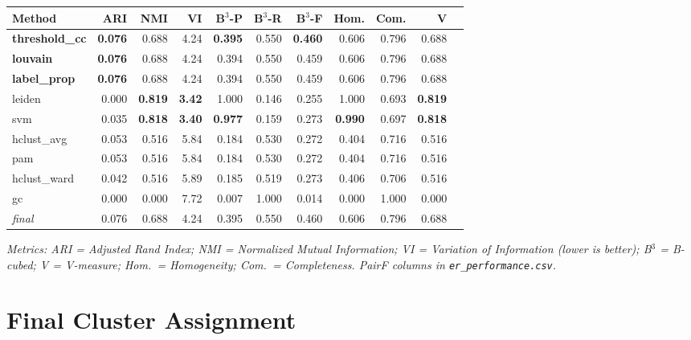\documentclass[11pt, a4paper]{article}
\begin{document}
\begin{table}[h!]
\centering
\small
\setlength{\tabcolsep}{4pt}
\begin{tabular}{lrrrrrrrrrr}
\toprule
\textbf{Method} & \textbf{ARI} & \textbf{NMI} & \textbf{VI} &
\textbf{B$^3$-P} & \textbf{B$^3$-R} & \textbf{B$^3$-F} &
\textbf{Hom.} & \textbf{Com.} & \textbf{V} \\
\midrule
\textbf{threshold\_cc} & \textbf{0.076} & 0.688 & 4.24 & \textbf{0.395} & 0.550 & \textbf{0.460} & 0.606 & 0.796 & 0.688 \\
\textbf{louvain}       & \textbf{0.076} & 0.688 & 4.24 & 0.394 & 0.550 & 0.459 & 0.606 & 0.796 & 0.688 \\
\textbf{label\_prop}   & \textbf{0.076} & 0.688 & 4.24 & 0.394 & 0.550 & 0.459 & 0.606 & 0.796 & 0.688 \\
leiden                 & 0.000 & \textbf{0.819} & \textbf{3.42} & 1.000 & 0.146 & 0.255 & 1.000 & 0.693 & \textbf{0.819} \\
svm                    & 0.035 & \textbf{0.818} & \textbf{3.40} & \textbf{0.977} & 0.159 & 0.273 & \textbf{0.990} & 0.697 & \textbf{0.818} \\
hclust\_avg            & 0.053 & 0.516 & 5.84 & 0.184 & 0.530 & 0.272 & 0.404 & 0.716 & 0.516 \\
pam                    & 0.053 & 0.516 & 5.84 & 0.184 & 0.530 & 0.272 & 0.404 & 0.716 & 0.516 \\
hclust\_ward           & 0.042 & 0.516 & 5.89 & 0.185 & 0.519 & 0.273 & 0.406 & 0.706 & 0.516 \\
gc                     & 0.000 & 0.000 & 7.72 & 0.007 & 1.000 & 0.014 & 0.000 & 1.000 & 0.000 \\
\midrule
\textit{final}         & 0.076 & 0.688 & 4.24 & 0.395 & 0.550 & 0.460 & 0.606 & 0.796 & 0.688 \\
\bottomrule
\end{tabular}
\end{table}

\textit{Metrics: ARI = Adjusted Rand Index; NMI = Normalized Mutual Information;
VI = Variation of Information (lower is better); B$^3$ = B-cubed; V = V-measure;
Hom.\ = Homogeneity; Com.\ = Completeness. PairF columns in \texttt{er\_performance.csv}.}

\section{Final Cluster Assignment}
\end{document}
